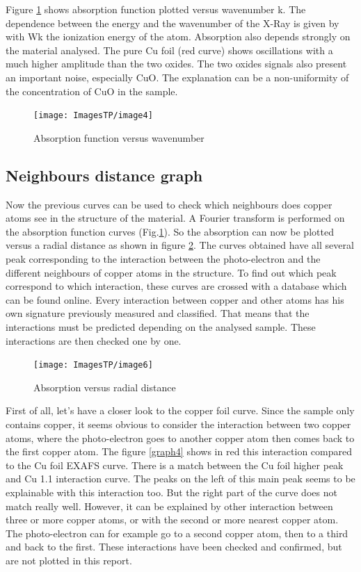 \documentclass[11pt,a4paper,oneside]{report}
\begin{document}
Figure \ref{graph2} shows absorption function plotted versus wavenumber k. The dependence between the energy and the wavenumber of the X-Ray is given by   with Wk the ionization energy of the atom.
Absorption also depends strongly on the material analysed. The pure Cu foil (red curve) shows oscillations with a much higher amplitude than the two oxides. The two oxides signals also present an important noise, especially CuO. The explanation can be a non-uniformity of the concentration of CuO in the sample.
\begin{figure}[H]
    \begin{center}
        \texttt{[image: ImagesTP/image4]}
        \caption{Absorption function versus wavenumber}
        \label{graph2}
    \end{center}
\end{figure}

\subsection{Neighbours distance graph}
Now the previous curves can be used to check which neighbours does copper atoms see in the structure of the material. A Fourier transform is performed on the absorption function curves (Fig.\ref{graph2}). So the absorption can now be plotted versus a radial distance as shown in figure \ref{graph3}. The curves obtained have all several peak corresponding to the interaction between the photo-electron and the different neighbours of copper atoms in the structure. To find out which peak correspond to which interaction, these curves are crossed with a database which can be found online. Every interaction between copper and other atoms has his own signature previously measured and classified. That means that the interactions must be predicted depending on the analysed sample. These interactions are then checked one by one.



\begin{figure}[H]
    \begin{center}
        \texttt{[image: ImagesTP/image6]}
        \caption{Absorption versus radial distance}
        \label{graph3}
    \end{center}
\end{figure}


First of all, let’s have a closer look to the copper foil curve. Since the sample only contains copper, it seems obvious to consider the interaction between two copper atoms, where the photo-electron goes to another copper atom then comes back to the first copper atom. The figure \ref{graph4} shows in red this interaction compared to the Cu foil EXAFS curve. There is a match between the Cu foil higher peak and Cu 1.1 interaction curve. The peaks on the left of this main peak seems to be explainable with this interaction too. But the right part of the curve does not match really well. However, it can be explained by other interaction between three or more copper atoms, or with the second or more nearest copper atom. The photo-electron can for example go to a second copper atom, then to a third and back to the first. These interactions have been checked and confirmed, but are not plotted in this report.
\end{document}

